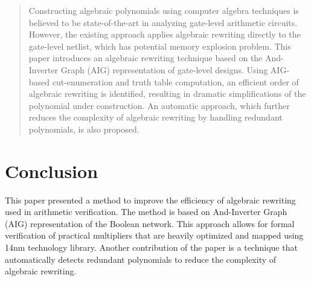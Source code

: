\documentclass[journal, 10pt]{IEEEtran}
\begin{document}
\begin{abstract}
Constructing algebraic polynomials using computer algebra techniques is believed to be state-of-the-art in analyzing gate-level arithmetic circuits. However, the existing approach applies algebraic rewriting directly to the gate-level netlist, which has potential memory explosion problem. This paper introduces an algebraic rewriting technique based on the And-Inverter Graph (AIG) representation of gate-level designs. Using AIG-based cut-enumeration and truth table computation, an efficient order of algebraic rewriting is identified, resulting in dramatic simplifications of the polynomial under construction. An automatic approach, which further reduces the complexity of algebraic rewriting by handling redundant polynomials, is also proposed. 
\end{abstract}






\maketitle

\IEEEdisplaynontitleabstractindextext

\IEEEpeerreviewmaketitle

\vspace{-3mm}

\section{Conclusion}
This paper presented a method to improve the efficiency of algebraic rewriting used in arithmetic verification. The method is based on And-Inverter Graph (AIG) representation of the Boolean network. This approach allows for formal verification of practical multipliers that are heavily optimized and mapped using 14nm technology library. Another contribution of the paper is a technique that automatically detects redundant polynomials to reduce the complexity of algebraic rewriting.
\end{document}
